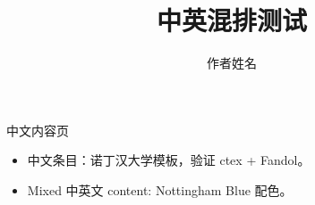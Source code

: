 \documentclass[10pt,aspectratio=169]{beamer}
\title{中英混排测试}
\author{作者姓名}
\begin{document}
\maketitle
\begin{frame}{中文内容页}
  \begin{itemize}
    \item 中文条目：诺丁汉大学模板，验证 ctex + Fandol。
    \item Mixed 中英文 content: Nottingham Blue 配色。
  \end{itemize}
\end{frame}
\end{document}
